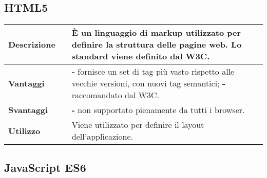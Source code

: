 \vspace{40px}
\subsection{HTML5}
\label{HTML5}
\begin{table}[H]
	\centering
	\begin{tabular}{p{2cm}p{0.5cm}p{11.5cm}}
		\arrayrulecolor{lightgray}
		\toprule
		\textbf{Descrizione} & &
		È un linguaggio di markup utilizzato per definire la struttura delle pagine web. Lo standard viene definito dal W3C.
		\\ \midrule
		\textbf{Vantaggi} & &
		\textbf{- }fornisce un set di tag più vasto rispetto alle vecchie versioni, con nuovi tag semantici;
		\newline
		\textbf{- }raccomandato dal W3C.
		\\ \midrule
		\textbf{Svantaggi} & &
		\textbf{- }non supportato pienamente da tutti i browser.
		\\ \midrule
		\textbf{Utilizzo} & &
		Viene utilizzato per definire il layout dell'applicazione.
		\\ \bottomrule
	\end{tabular}
\end{table}



\vspace{40px}
\subsection{JavaScript ES6}
\label{JavaScript ES6}

